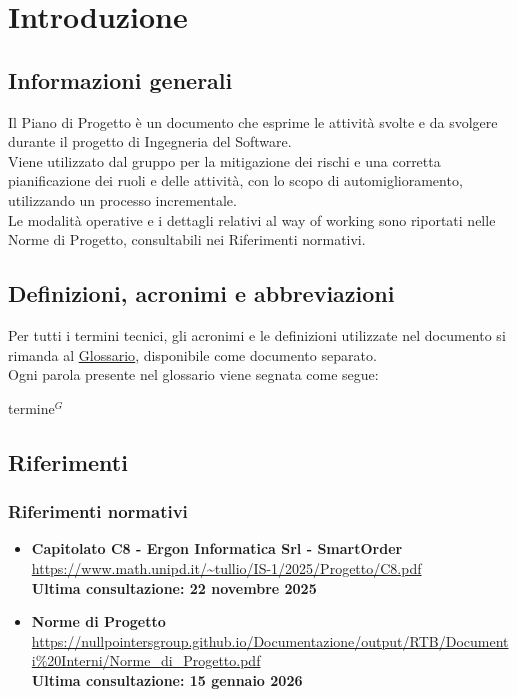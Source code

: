 \section{Introduzione}
	\subsection{Informazioni generali}
	Il Piano di Progetto è un documento che esprime le attività svolte e da svolgere durante il progetto di Ingegneria del Software. \\
	Viene utilizzato dal gruppo per la mitigazione dei rischi e una corretta pianificazione dei ruoli e delle attività, con lo scopo di automiglioramento, utilizzando un processo incrementale.\\
	Le modalità operative e i dettagli relativi al way of working sono riportati nelle Norme di Progetto, consultabili nei Riferimenti normativi.
	
	\subsection{Definizioni, acronimi e abbreviazioni}
	Per tutti i termini tecnici, gli acronimi e le definizioni utilizzate nel documento si rimanda al \underline{\href{https://nullpointersgroup.github.io/Documentazione/output/RTB/Documenti\%20Interni/Glossario.pdf}{Glossario}}, disponibile come documento separato.\\
	Ogni parola presente nel glossario viene segnata come segue:
	\begin{center}
		termine$^{G}$
	\end{center}
	
	\subsection{Riferimenti}
	\subsubsection{Riferimenti normativi}
	\begin{itemize}[itemsep=5pt, parsep=5pt, label=$\scriptstyle\bullet$]
	
	\item \textbf{Capitolato C8 - Ergon Informatica Srl - SmartOrder}\\
	\url{https://www.math.unipd.it/~tullio/IS-1/2025/Progetto/C8.pdf}\\[3pt]
	\textbf{Ultima consultazione: 22 novembre 2025}
	
	\item \textbf{Norme di Progetto}\\
	\url{https://nullpointersgroup.github.io/Documentazione/output/RTB/Documenti%20Interni/Norme_di_Progetto.pdf}\\[3pt]
	\textbf{Ultima consultazione: 15 gennaio 2026}
	\end{itemize}

